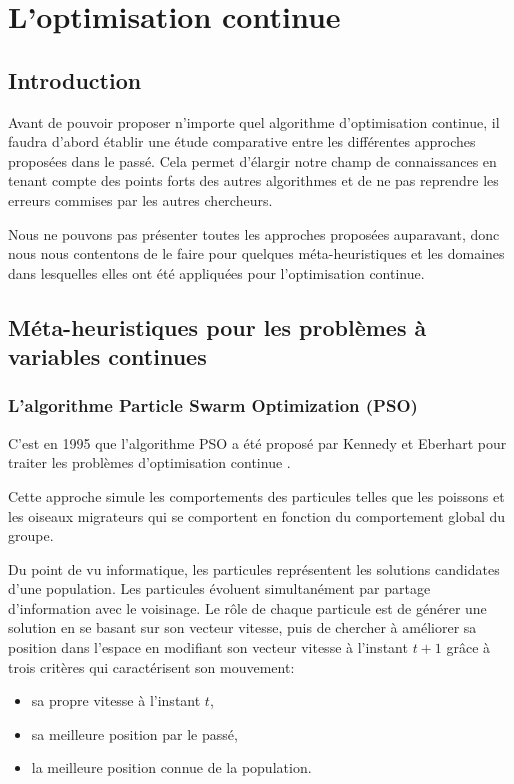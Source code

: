 \chapter{L'optimisation continue} 

\section*{Introduction}

Avant de pouvoir proposer n'importe quel algorithme d'optimisation continue, il faudra d'abord établir une étude comparative entre les différentes approches proposées dans le passé. Cela permet d'élargir notre champ de connaissances en tenant compte des points forts des autres algorithmes et de ne pas reprendre les erreurs commises par les autres chercheurs.

Nous ne pouvons pas présenter toutes les approches proposées auparavant, donc nous nous contentons de le faire pour quelques méta-heuristiques et les domaines dans lesquelles elles ont été appliquées pour l'optimisation continue.
\section{Méta-heuristiques pour les problèmes à variables continues}
\subsection{L'algorithme Particle Swarm Optimization (PSO)}
C'est en 1995 que l'algorithme PSO a été proposé par Kennedy et Eberhart pour traiter les problèmes d'optimisation continue \cite{KENNEDY_EBERHART_1995}.

Cette approche simule les comportements des particules telles que les poissons et les oiseaux migrateurs qui se comportent en fonction du comportement global du groupe.

Du point de vu informatique, les particules représentent les solutions candidates d'une population. Les particules évoluent simultanément par partage d'information avec le voisinage. Le rôle de chaque particule est de générer une solution en se basant sur son vecteur vitesse, puis de chercher à améliorer sa position dans l'espace en modifiant son vecteur vitesse à l'instant $t+1$ grâce à trois critères qui caractérisent son mouvement: \\
\vspace{-2em}

\begin{itemize}
	\item sa propre vitesse à l'instant $t$,
	\item sa meilleure position par le passé,
	\item la meilleure position connue de la population.
\end{itemize}

